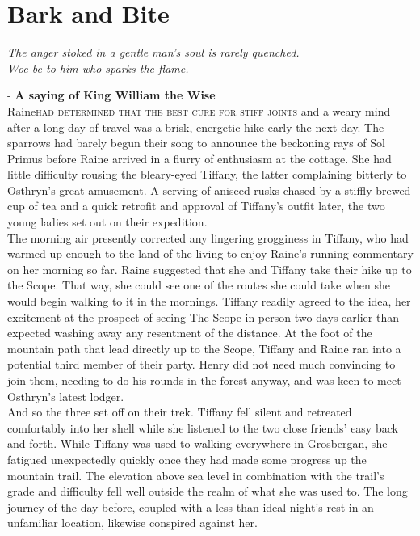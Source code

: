 \chapter{Bark and Bite}

\begin{center}
    \textit{The anger stoked in a gentle man's soul is rarely quenched. \\
    Woe be to him who sparks the flame.}\\
\end{center}

- \textbf{A saying of King William the Wise} \\


\lettrine{Raine}{had determined that the best cure for stiff joints} and a weary mind after a long day of travel was a brisk, energetic hike early the next day.
The sparrows had barely begun their song to announce the beckoning rays of Sol Primus before Raine arrived in a flurry of enthusiasm at the cottage. 
She had little difficulty rousing the bleary-eyed Tiffany, the latter complaining bitterly to Osthryn's great amusement.
A serving of aniseed rusks chased by a stiffly brewed cup of tea and a quick retrofit and approval of Tiffany's outfit later, the two young ladies set out on their expedition.\\

The morning air presently corrected any lingering grogginess in Tiffany, who had warmed up enough to the land of the living to enjoy Raine's running commentary on her morning so far.
Raine suggested that she and Tiffany take their hike up to the Scope. 
That way, she could see one of the routes she could take when she would begin walking to it in the mornings. 
Tiffany readily agreed to the idea, her excitement at the prospect of seeing The Scope in person two days earlier than expected washing away any resentment of the distance.
At the foot of the mountain path that lead directly up to the Scope, Tiffany and Raine ran into a potential third member of their party.
Henry did not need much convincing to join them, needing to do his rounds in the forest anyway, and was keen to meet Osthryn's latest lodger.\\

And so the three set off on their trek. 
Tiffany fell silent and retreated comfortably into her shell while she listened to the two close friends' easy back and forth.
While Tiffany was used to walking everywhere in Grosbergan, she fatigued unexpectedly quickly once they had made some progress up the mountain trail. 
The elevation above sea level in combination with the trail's grade and difficulty fell well outside the realm of what she was used to.
The long journey of the day before, coupled with a less than ideal night's rest in an unfamiliar location, likewise conspired against her.\\

